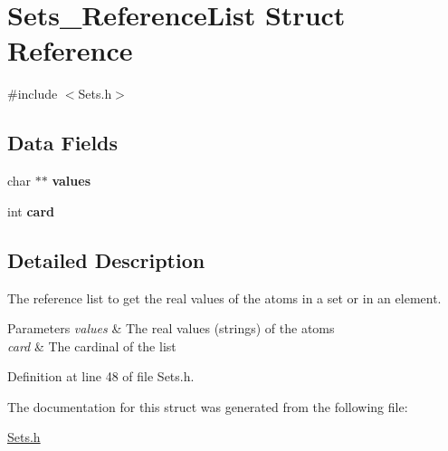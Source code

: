 \hypertarget{struct_sets___reference_list}{
\section{Sets\_\-ReferenceList Struct Reference}
\label{struct_sets___reference_list}
}


{\ttfamily \#include $<$Sets.h$>$}

\subsection*{Data Fields}
\begin{DoxyCompactItemize}
\item 
\hypertarget{struct_sets___reference_list_ada2188333c6f540ad9cbe7c0e17003db}{
char $\ast$$\ast$ {\bfseries values}}
\label{struct_sets___reference_list_ada2188333c6f540ad9cbe7c0e17003db}

\item 
\hypertarget{struct_sets___reference_list_acd789e381a684163a021e2d228653afd}{
int {\bfseries card}}
\label{struct_sets___reference_list_acd789e381a684163a021e2d228653afd}

\end{DoxyCompactItemize}


\subsection{Detailed Description}
The reference list to get the real values of the atoms in a set or in an element. 
\begin{DoxyParams}{Parameters}
{\em values} & The real values (strings) of the atoms \\
\hline
{\em card} & The cardinal of the list \\
\hline
\end{DoxyParams}


Definition at line 48 of file Sets.h.



The documentation for this struct was generated from the following file:\begin{DoxyCompactItemize}
\item 
\hyperlink{_sets_8h}{Sets.h}\end{DoxyCompactItemize}
